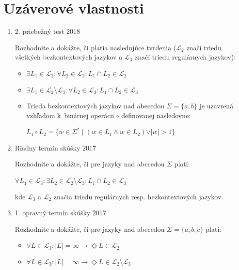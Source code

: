 \documentclass[]{article}
\begin{document}
	\section{Uzáverové vlastnosti}
	\begin{enumerate}
		\item 2. priebežný test 2018
	
		Rozhodnite a dokážte, či platia nasledujúce tvrdenia ($\mathcal{L}_2$ značí triedu všetkých bezkontextových jazykov a $\mathcal{L}_3$ značí triedu regulárnych jazykov):
		
		\begin{itemize}
			\item $\exists L_1 \in \mathcal{L}_2: \forall L_2 \in \mathcal{L}_2: L_1 \cap L_2 \in \mathcal{L}_2$
			
			\item $\exists L_1 \in \mathcal{L}_2 \setminus \mathcal{L}_3: \forall L_2 \in \mathcal{L}_3: L_1 \cap L_2 \in \mathcal{L}_3$
			
			\item Trieda bezkontextových jazykov nad abecedou $\Sigma = \{a,b\}$ je uzavrená vzhľadom k~binárnej operácii $\circ$ definovanej nasledovne:
			
			$L_1 \circ L_2 = \{w \in \Sigma^* \mid (w \in L_1 \land w \in L_2) \lor \vert w \vert > 1\}$
		\end{itemize}

		\item Riadny termín skúšky 2017
	
		Rozhodnite a dokážte, či pre jazyky nad abecedou $\Sigma$ platí:
		
		$\forall L_1 \in \mathcal{L}_3: \exists L_2 \in \mathcal{L}_2 \setminus \mathcal{L}_3: L_1 \cap L_2 \in \mathcal{L}_3$
			
		kde $\mathcal{L}_3$ a $\mathcal{L}_2$ značia triedu regulárnych resp. bezkontextových jazykov.
	
		\item 1. opravný termín skúšky 2017
	
		Rozhodnite a dokážte, či pre jazyky nad abecedou $\Sigma = \{a,b,c\}$ platí:
		
		\begin{itemize}
			\item $\forall L \in \mathcal{L}_3: \vert L \vert = \infty \rightarrow \Diamond L \in  \mathcal{L}_2$
			\item $\forall L \in \mathcal{L}_3: \vert L \vert = \infty \rightarrow \Diamond L \in  \mathcal{L}_2 \setminus \mathcal{L}_3$
		\end{itemize}	
	

\end{enumerate}
\end{document}

